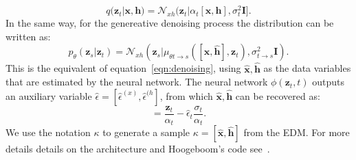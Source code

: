 \documentclass[journal=jacsat,manuscript=article]{achemso}
\begin{document}
\begin{equation}
    q(\mathbf{z}_t| \mathbf{x},\mathbf{h}) = \mathcal{N}_{xh}(\mathbf{z}_t|\alpha_t[\mathbf{x,h}],\sigma^2_t\mathbf{I}].
\end{equation}
In the same way, for the genereative denoising process the distribution can be written as:
\begin{equation}
    p_\theta(\mathbf{z}_s| \mathbf{z}_t) = \mathcal{N}_{xh}(\mathbf{z}_s | \mu_{\theta t\rightarrow s}( [ \mathbf{\hat{x},\hat{h}}],\mathbf{z}_t),\sigma_{t\rightarrow s}^2\mathbf{I}).
\end{equation}
This is the equivalent of equation~\ref{eqn:denoising}, using $\mathbf{\hat{x}}, \mathbf{\hat{h}}$ as the data variables that are estimated by the neural network. The neural network $\phi(\mathbf{z}_t,t)$ outputs an auxiliary variable $\hat\epsilon = [\hat{\epsilon}^{(x)},\hat{\epsilon}^{(h}]$, from which $\mathbf{\hat{x}}, \mathbf{\hat{h}}$ can be recovered as:
\begin{equation}
    [\mathbf{\hat{x}}, \mathbf{\hat{h}}] = \frac{\mathbf{z}_t}{\alpha_t}-\hat{\epsilon}_t\frac{\sigma_t}{\alpha_t}.
\end{equation}
We use the notation $\kappa$ to generate a sample $\kappa = [\mathbf{\hat{x}}, \mathbf{\hat{h}}]$ from the EDM. 
For more details details on the architecture and Hoogeboom's code see~\cite{hoogeboom2022equivariant}. 

\end{document}

